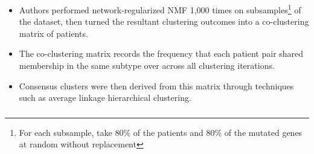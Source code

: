 \begin{frame}[fragile] \frametitle{}
    \begin{itemize}
        \item Authors performed network-regularized NMF 1,000 times on
            subsamples\footnote{
                 For each subsample, take 80\% of the patients and 80\% of the
                 mutated genes at random without replacement 
                 \vspace{0.2cm}
             } of the dataset, then turned the resultant clustering
            outcomes into a co-clustering matrix of patients.
        \item The co-clustering matrix records the frequency that each
            patient pair shared membership in the same subtype over across
            all clustering iterations.
        \item Consensus clusters were then derived from this matrix through
            techniques such as average linkage hierarchical clustering.
    \end{itemize}
\end{frame}
\begin{frame}[fragile] \frametitle{}
\end{frame}
\iffalse

